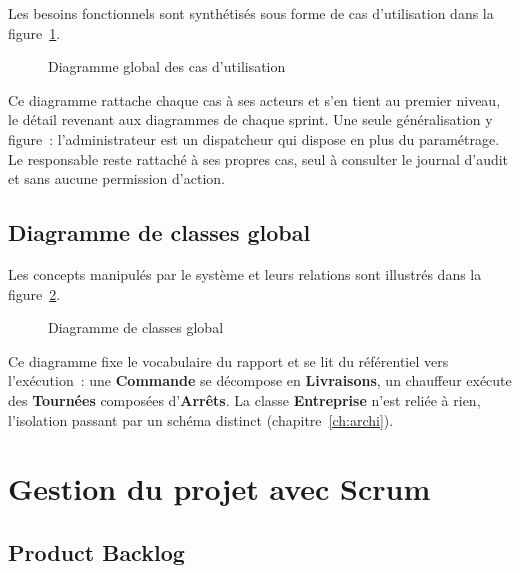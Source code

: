 Les besoins fonctionnels sont synthétisés sous forme de cas d'utilisation dans la
figure~\ref{fig:uc-global}.

\begin{figure}[H]
\centering
\caption{Diagramme global des cas d'utilisation}
\label{fig:uc-global}
\end{figure}

Ce diagramme rattache chaque cas à ses acteurs et s'en tient au premier niveau, le détail revenant
aux diagrammes de chaque sprint. Une seule généralisation y figure~: l'administrateur est un
dispatcheur qui dispose en plus du paramétrage. Le responsable reste rattaché à ses propres cas,
seul à consulter le journal d'audit et sans aucune permission d'action.

\subsection{Diagramme de classes global}

Les concepts manipulés par le système et leurs relations sont illustrés dans la
figure~\ref{fig:class-global}.

\begin{figure}[H]
\centering
{}
\caption{Diagramme de classes global}
\label{fig:class-global}
\end{figure}

Ce diagramme fixe le vocabulaire du rapport et se lit du référentiel vers l'exécution~: une
\textbf{Commande} se décompose en \textbf{Livraisons}, un chauffeur exécute des \textbf{Tournées}
composées d'\textbf{Arrêts}. La classe \textbf{Entreprise} n'est reliée à rien, l'isolation passant
par un schéma distinct (chapitre~\ref{ch:archi}).

\section{Gestion du projet avec Scrum}

\subsection{Product Backlog}

